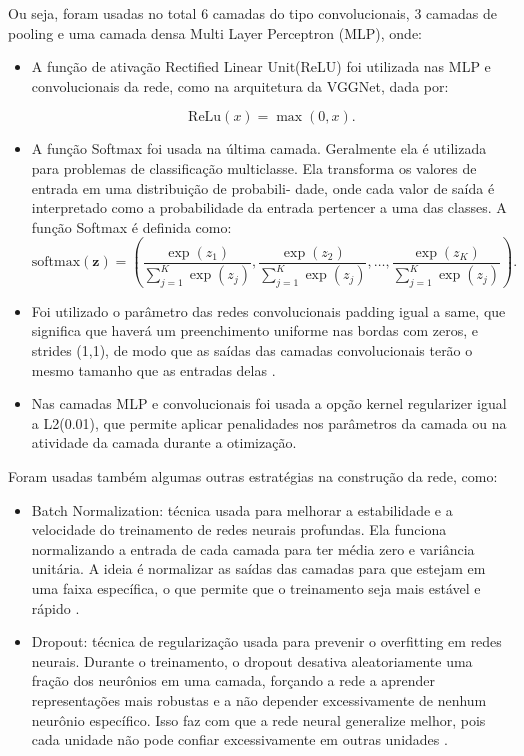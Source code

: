 \documentclass[]{abntex2}
\begin{document}
Ou seja, foram usadas no total 6 camadas do tipo convolucionais, 3 camadas de pooling e uma camada densa Multi Layer Perceptron (MLP), onde:

\begin{itemize}
    \item A função de ativação Rectified Linear Unit(ReLU) foi utilizada nas MLP e convolucionais da rede, como na arquitetura da VGGNet, dada por:
    
    \[
    \text{ReLu}(x) = \max(0, x).
    \]

    \item A função Softmax foi usada na última camada. Geralmente ela é utilizada para problemas de
    classificação multiclasse. Ela transforma os valores de entrada em uma distribuição de probabili-
    dade, onde cada valor de saída é interpretado como a probabilidade da entrada pertencer a uma
    das classes. A função Softmax é definida como:
    \[
        \text{softmax}(\mathbf{z}) = \left( \frac{\exp(z_1)}{\sum_{j=1}^{K} \exp(z_j)}, \frac{\exp(z_2)}{\sum_{j=1}^{K} \exp(z_j)}, \ldots, \frac{\exp(z_K)}{\sum_{j=1}^{K} \exp(z_j)} \right).
    \]
    
    \item Foi utilizado o parâmetro das redes convolucionais padding igual a same, que significa que haverá um preenchimento uniforme nas bordas com zeros, e strides (1,1), de modo que as saídas das camadas convolucionais terão o mesmo tamanho que as entradas delas \cite{keras}.
    \item Nas camadas MLP e convolucionais foi usada a opção kernel regularizer igual a L2(0.01), que permite aplicar penalidades nos parâmetros da camada ou na atividade da camada durante a otimização.
\end{itemize}

Foram usadas também algumas outras estratégias na construção da rede, como:

\begin{itemize}
    \item Batch Normalization: técnica usada para melhorar a estabilidade e a velocidade do treinamento de redes neurais profundas. Ela funciona normalizando a entrada de cada camada para ter média zero e variância unitária. A ideia é normalizar as saídas das camadas para que estejam em uma faixa específica, o que permite que o treinamento seja mais estável e rápido \cite{ioffe2015batch}.
    \item Dropout: técnica de regularização usada para prevenir o overfitting em redes neurais. Durante o treinamento, o dropout desativa aleatoriamente uma fração dos neurônios em uma camada, forçando a rede a aprender representações mais robustas e a não depender excessivamente de nenhum neurônio específico. Isso faz com que a rede neural generalize melhor, pois cada unidade não pode confiar excessivamente em outras unidades \cite{srivastava2014dropout}.
\end{itemize}
\end{document}

